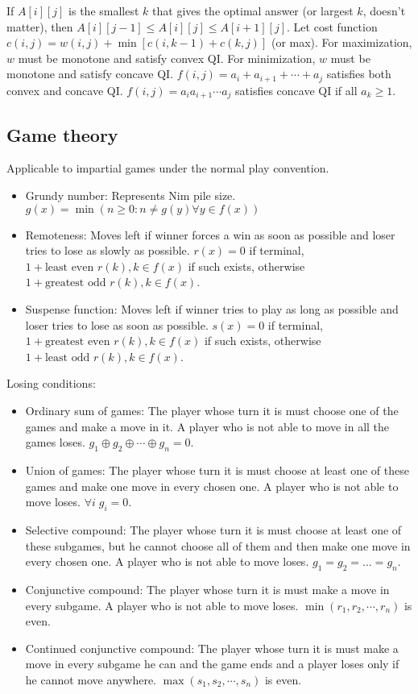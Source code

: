 \documentclass[letterpaper]{article}
\begin{document}
If $A[i][j]$ is the smallest $k$ that gives the optimal answer (or largest $k$, doesn't matter), then $A[i][j-1] \leq A[i][j] \leq A[i+1][j]$. Let cost function $c(i,j) = w(i,j) + \min\left[c(i,k-1) + c(k,j)\right]$ (or max). For maximization, $w$ must be monotone and satisfy convex QI. For minimization, $w$ must be monotone and satisfy concave QI. $f(i,j) = a_i + a_{i+1} + \cdots + a_j$ satisfies both convex and concave QI. $f(i,j) = a_ia_{i+1}\cdots a_j$ satisfies concave QI if all $a_k \geq 1$.

\subsection{Game theory}
Applicable to impartial games under the normal play convention.
\begin{itemize}
\item Grundy number: Represents Nim pile size. $g\left(x\right) = \min\left(n \geq 0 : n \neq g\left(y\right) \forall y \in f\left(x\right)\right)$
\item Remoteness: Moves left if winner forces a win as soon as possible and loser tries to lose as slowly as possible. $r\left(x\right) = 0$ if terminal, $1 + \text{least even } r(k), k \in f\left(x\right)$ if such exists, otherwise $1 + \text{greatest odd } r(k), k \in f\left(x\right)$.
\item Suspense function: Moves left if winner tries to play as long as possible and loser tries to lose as soon as possible. $s\left(x\right) = 0$ if terminal, $1 + \text{greatest even } r(k), k \in f\left(x\right)$ if such exists, otherwise $1 + \text{least odd } r(k), k \in f\left(x\right)$.
\end{itemize}
	
Losing conditions:
\begin{itemize}
\item Ordinary sum of games: The player whose turn it is must choose one of the games and make a move in it. A player who is not able to move in all the games loses. $g_1 \oplus g_2 \oplus \cdots \oplus g_n = 0$.
\item Union of games: The player whose turn it is must choose at least one of these games and make one move in every chosen one.  A player who is not able to move loses. $\forall i \; g_i=0$.
\item Selective compound: The player whose turn it is must choose at least one of these subgames, but he cannot choose all of them and then make one move in every chosen one. A player who is not able to move loses. $g_1=g_2=...=g_n$.
\item Conjunctive compound: The player whose turn it is must make a move in every subgame. A player who is not able to move loses. $\min(r_1,r_2,\cdots,r_n)$ is even.
\item Continued conjunctive compound: The player whose turn it is must make a move in every subgame he can and the game ends and a player loses only if he cannot move anywhere. $\max(s_1,s_2,\cdots,s_n)$ is even.
\end{itemize}
\end{document}
